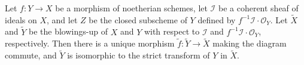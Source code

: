 Let $f: Y \to X$ be a morphism of noetherian schemes, let $\mathcal{I}$ be a coherent sheaf of ideals on $X$, and let $Z$ be the closed subscheme of $Y$ defined by $f^{-1}\mathcal{I} \cdot \mathcal{O}_Y$. Let $\tilde{X}$ and $\tilde{Y}$ be the blowings-up of $X$ and $Y$ with respect to $\mathcal{I}$ and $f^{-1}\mathcal{I} \cdot \mathcal{O}_Y$, respectively. Then there is a unique morphism $\tilde{f}: \tilde{Y} \to \tilde{X}$ making the diagram commute, and $\tilde{Y}$ is isomorphic to the strict transform of $Y$ in $\tilde{X}$.
